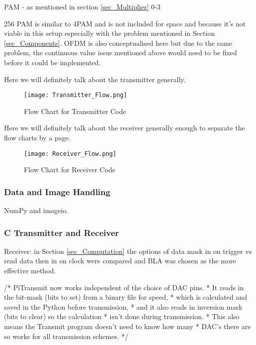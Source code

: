 \documentclass[../main.tex]{subfiles}
\begin{document}
PAM - as mentioned in section \ref{sec_Multiplier} 0-3

256 PAM is similar to 4PAM and is not included for space and because it's not viable in this setup especially with the problem mentioned in Section \ref{sec_Components}.
OFDM is also conceptualised here but due to the same problem, the continuous value issue mentioned above would need to be fixed before it could be implemented.

Here we will definitely talk about the transmitter generally.\\

\begin{figure}[ht]
	\centering
	\texttt{[image: Transmitter\_Flow.png]}
	\caption{Flow Chart for Transmitter Code}
	\label{fig_Transmitter_Flow}
\end{figure}

Here we will definitely talk about the receiver generally enough to separate the flow charts by a page.\\

\begin{figure}[ht]
	\centering
	\texttt{[image: Receiver\_Flow.png]}
	\caption{Flow Chart for Receiver Code}
	\label{fig_Receiver_Flow}
\end{figure}

\subsubsection{Data and Image Handling}

NumPy and imageio.\\

\subsubsection{C Transmitter and Receiver}

Receiver: in Section \ref{sec_Computation} the options of data mask in on trigger vs read data then in on clock were compared and BLA was chosen as the more effective method.

/* PiTransmit now works independent of the choice of DAC pins.
* It reads in the bit-mask (bits to set) from a binary file for speed,
* which is calculated and saved in the Python before transmission,
* and it also reads in inversion mask (bits to clear) so the calculation
* isn't done during transmission.
* This also means the Transmit program doesn't need to know how many
* DAC's there are so works for all transmission schemes.
*/
\end{document}
